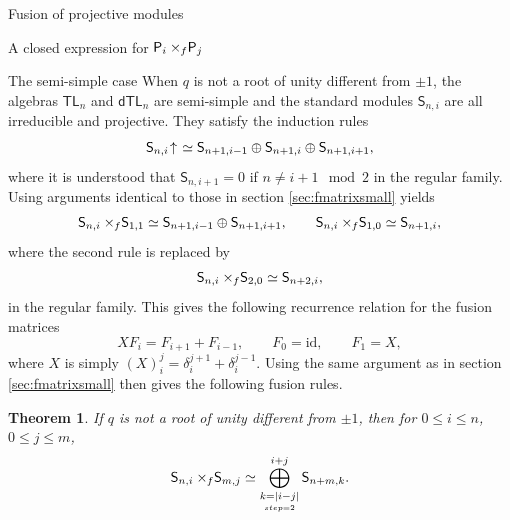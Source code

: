 \documentclass[reqno]{amsart}
\newtheorem{Thm}{Theorem}[section]
\newtheorem{Coro}[Thm]{Corollary}
\newcommand{\dtl}[1]{\mathsf{dTL}_{#1}}
\newcommand{\tl}[1]{\mathsf{TL}_{#1}}
\newcommand{\ds}[1]{\mathsf S_{#1}}
\newcommand{\dP}[1]{\mathsf P_{#1}}
\newcommand{\xf}{\times\hspace{-0.27em}_f}
\newcommand{\F}[1]{F_{#1}}
\newcommand{\Ind}[1]{#1{}\hspace{-0.18em} \uparrow{}\hskip -0.18em}
\begin{document}
\begin{section}{Fusion of projective modules}
\begin{subsection}{A closed expression for $\dP{i} \xf \dP{j}$}
\end{subsection}
\begin{subsection}{The semi-simple case}
When $q$ is not a root of unity different from $\pm 1$, the algebras $\tl{n}$ and $\dtl{n}$ are semi-simple and the standard modules $\ds{n,i}$ are all irreducible and projective. They satisfy the induction rules $$ \Ind{\ds{n,i}} \simeq \ds{n+1,i-1}\oplus \ds{n+1,i} \oplus \ds{n+1,i+1}, $$ where it is understood that $\ds{n,i+1} = 0$ if $n \neq i+1 \mod 2$ in the regular family. Using arguments identical to those in section \ref{sec:fmatrixsmall} yields
\begin{equation*}
\ds{n,i} \xf \ds{1,1} \simeq \ds{n+1,i-1} \oplus \ds{n+1,i+1}, \qquad \ds{n,i} \xf \ds{1,0} \simeq \ds{n+1,i},
\end{equation*}
where the second rule is replaced by $$\ds{n,i} \xf \ds{2,0} \simeq \ds{n+2,i}, $$ in the regular family. This gives the following recurrence relation for the fusion matrices
\begin{equation}
X\F{i} = \F{i+1} + \F{i-1}, \qquad \F{0} = \text{id}, \qquad \F{1} = X,
\end{equation}
where $X$ is simply $(X)_{i}^{j} = \delta_{i}^{j+1} + \delta_{i}^{j-1}.$ Using the same argument as in section \ref{sec:fmatrixsmall} then gives the following fusion rules.
\begin{Thm} 
If $q$ is not a root of unity different from $\pm 1$, then for $0\leq i \leq n$, $0 \leq j \leq m$,
$$\ds{n,i} \xf \ds{m,j} \simeq \bigoplus_{\underset{step=2}{k = |i-j|}}^{i+j} \ds{n+m,k}.$$
\end{Thm}
\end{subsection}
\end{section}
\end{document}
